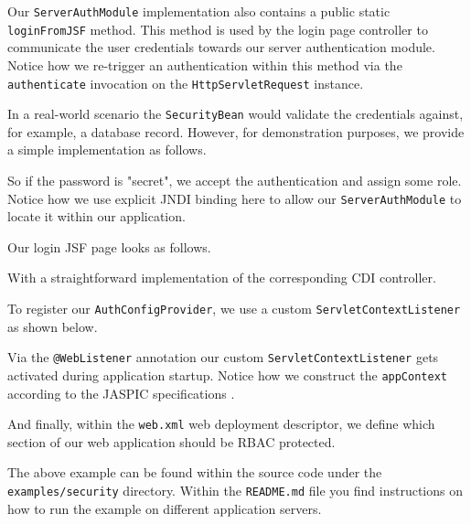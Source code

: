 Our \texttt{ServerAuthModule} implementation also contains a public static \texttt{loginFromJSF} method.
This method is used by the login page controller to communicate the user credentials towards our server authentication module.
Notice how we re-trigger an authentication within this method via the \texttt{authenticate} invocation on the \texttt{HttpServletRequest} instance.

In a real-world scenario the \texttt{SecurityBean} would validate the credentials against, for example, a database record.
However, for demonstration purposes, we provide a simple implementation as follows.

So if the password is "secret", we accept the authentication and assign some role.
Notice how we use explicit JNDI binding here to allow our \texttt{ServerAuthModule} to locate it within our application.

Our login JSF page looks as follows.

With a straightforward implementation of the corresponding CDI controller. 


To register our \texttt{AuthConfigProvider},
we use a custom \texttt{ServletContextListener} as shown below.

Via the \texttt{@WebListener} annotation our custom \texttt{ServletContextListener} gets activated during application startup.
Notice how we construct the \texttt{appContext} according to the JASPIC specifications \cite{jaspic}.

And finally, within the \texttt{web.xml} web deployment descriptor,
we define which section of our web application should be RBAC protected.


The above example can be found within the source code under the \texttt{examples/security} directory.
Within the \texttt{README.md} file you find instructions on how to run the example on different application servers.

